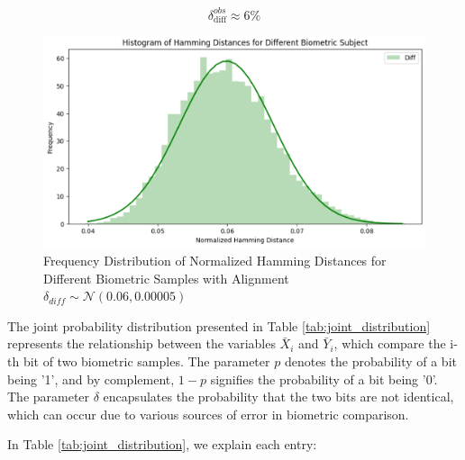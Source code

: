 \begin{enumerate}
\begin{itemize}
        \[ \delta_{\text{diff}}^{obs} \approx 6\% \]

        \begin{figure}[H]
            \centering
            \includegraphics[width=0.7\linewidth]{latex-img/delta_diff.png}
            \caption{Frequency Distribution of Normalized Hamming Distances for Different Biometric Samples with Alignment \(\delta_{diff} \sim \mathcal{N}(0.06, 0.00005)\)}
            \label{delta_diff}
        \end{figure}
    \end{itemize}
\end{enumerate}

The joint probability distribution presented in Table \ref{tab:joint_distribution} represents the relationship between the variables \(\bar{X}_i\) and \(\bar{Y}_i\), which compare the i-th bit of two biometric samples. The parameter \(p\) denotes the probability of a bit being '1', and by complement, \(1-p\) signifies the probability of a bit being '0'. The parameter \(\delta\) encapsulates the probability that the two bits are not identical, which can occur due to various sources of error in biometric comparison. 

In Table \ref{tab:joint_distribution}, we explain each entry:

